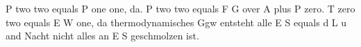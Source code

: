 P two two equals P one one, da.  
P two two equals F G over A plus P zero.  
T zero two equals E W one, da thermodynamisches Ggw entsteht alle E S equals d L u and Nacht nicht alles an E S geschmolzen ist.